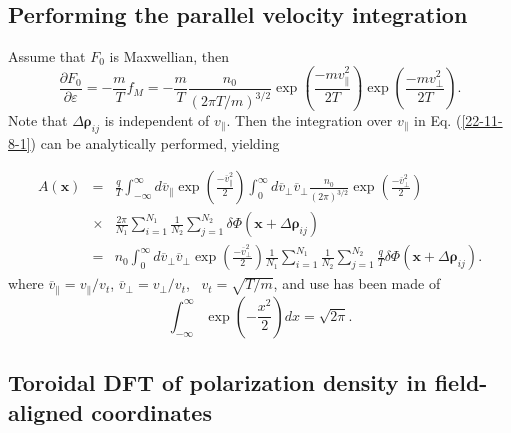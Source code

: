 \documentclass{llncs}
\begin{document}
\

\subsection{Performing the parallel velocity integration}

Assume that $F_0$ is Maxwellian, then
\begin{equation}
  \frac{\partial F_0}{\partial \varepsilon} = - \frac{m}{T} f_M = -
  \frac{m}{T} \frac{n_0}{(2 \pi T / m)^{3 / 2}} \exp \left( \frac{- m
  v^2_{\parallel}}{2 T} \right) \exp \left( \frac{- m v^2_{\perp}}{2 T}
  \right) .
\end{equation}
Note that $\Delta \mathbf{\rho}_{i j}$ is independent of $v_{\parallel}$. Then
the integration over $v_{\parallel}$ in Eq. (\ref{22-11-8-1}) can be
analytically performed, yielding


\begin{eqnarray}
  A (\mathbf{x}) & = & \frac{q}{T}  \int_{- \infty}^{\infty} d
  \overline{v}_{\parallel} \exp \left( \frac{- \overline{v}^2_{\parallel}}{2}
  \right) \int_0^{\infty} d \overline{v}_{\perp} \overline{v}_{\perp}
  \frac{n_0}{(2 \pi)^{3 / 2}} \exp \left( \frac{- \overline{v}^2_{\perp}}{2}
  \right) \nonumber\\
  & \times & \frac{2 \pi}{N_1} \sum_{i = 1}^{N_1} \frac{1}{N_2}  \sum_{j =
  1}^{N_2} \delta \Phi (\mathbf{x} + \Delta \mathbf{\rho}_{i j}) \nonumber\\
  & = & n_0  \int_0^{\infty} d \overline{v}_{\perp} \overline{v}_{\perp} \exp
  \left( \frac{- \overline{v}^2_{\perp}}{2} \right) \frac{1}{N_1} \sum_{i =
  1}^{N_1} \frac{1}{N_2}  \sum_{j = 1}^{N_2} \frac{q}{T} \delta \Phi
  (\mathbf{x} + \Delta \mathbf{\rho}_{i j}) .  \label{21-9-16-a5}
\end{eqnarray}
where $\overline{v}_{\parallel} = v_{\parallel} / v_t$, $\overline{v}_{\perp}
= v_{\perp} / v_t$, \ $v_t = \sqrt{T / m}$, and use has been made of
\begin{equation}
  \int_{- \infty}^{\infty} \exp \left( - \frac{x^2}{2} \right) d x = \sqrt{2
  \pi} .
\end{equation}

\subsection{Toroidal DFT of polarization density in field-aligned coordinates}
\end{document}

